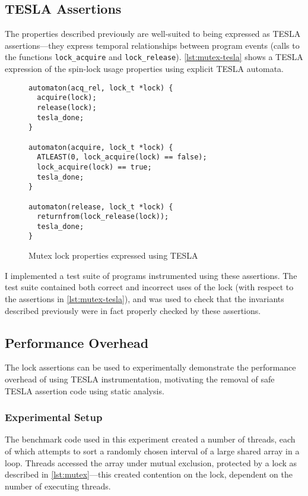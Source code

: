 \subsection{TESLA Assertions} \label{sec:lock-assertions}

The properties described previously are well-suited to being expressed as TESLA
assertions---they express temporal relationships between program events (calls
to the functions \texttt{lock_acquire} and \texttt{lock_release}).
\autoref{lst:mutex-tesla} shows a TESLA expression of the spin-lock usage
properties using explicit TESLA automata.
\begin{figure}
  \begin{verbatim}
automaton(acq_rel, lock_t *lock) {
  acquire(lock);
  release(lock);
  tesla_done;
}

automaton(acquire, lock_t *lock) {
  ATLEAST(0, lock_acquire(lock) == false);
  lock_acquire(lock) == true;
  tesla_done;
}

automaton(release, lock_t *lock) {
  returnfrom(lock_release(lock));
  tesla_done;
}
  \end{verbatim}
  \caption{Mutex lock properties expressed using TESLA}
  \label{lst:mutex-tesla}
\end{figure}

I implemented a test suite of programs instrumented using these assertions. The
test suite contained both correct and incorrect uses of the lock (with respect
to the assertions in \autoref{lst:mutex-tesla}), and was used to check that the
invariants described previously were in fact properly checked by these
assertions.

\subsection{Performance Overhead}

The lock assertions can be used to experimentally demonstrate the performance
overhead of using TESLA instrumentation, motivating the removal of safe TESLA
assertion code using static analysis.

\subsubsection{Experimental Setup}

The benchmark code used in this experiment created a number of threads, each of
which attempts to sort a randomly chosen interval of a large shared array in a
loop. Threads accessed the array under mutual exclusion, protected by a lock as
described in \autoref{lst:mutex}---this created contention on the lock,
dependent on the number of executing threads.

